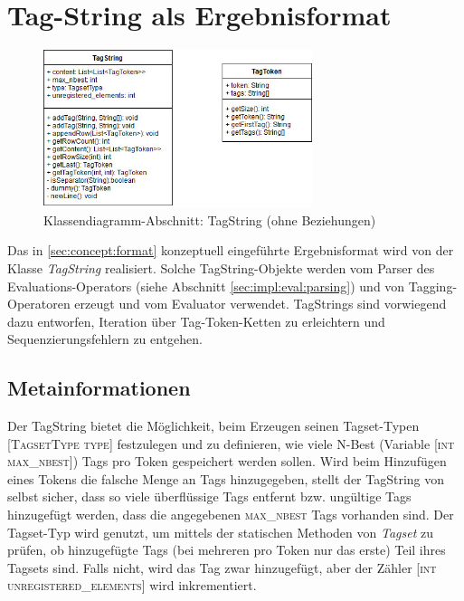 \section{Tag-String als Ergebnisformat}
\label{sec:impl:tagstring}

\begin{figure}[htb]
	\centering
	\captionsetup{justification=centering,margin=2cm}
	\includegraphics[width=0.7\textwidth]{gfx/tagstring_uml.jpg}
	
	\caption{Klassendiagramm-Abschnitt: TagString (ohne Beziehungen)} 
	\label{fig:impl:tagstring:uml}
\end{figure}

Das in \ref{sec:concept:format} konzeptuell eingeführte Ergebnisformat wird von der Klasse \textit{TagString} realisiert. Solche TagString-Objekte werden vom Parser des Evaluations-Operators (siehe Abschnitt \ref{sec:impl:eval:parsing}) und von Tagging-Operatoren erzeugt und vom Evaluator verwendet. TagStrings sind vorwiegend dazu entworfen, Iteration über Tag-Token-Ketten zu erleichtern und Sequenzierungsfehlern zu entgehen.

\subsection{Metainformationen}
Der TagString bietet die Möglichkeit, beim Erzeugen seinen Tagset-Typen \textsc{[TagsetType type]} festzulegen und zu definieren, wie viele N-Best (Variable \textsc{[int max\_nbest]}) Tags pro Token gespeichert werden sollen. Wird beim Hinzufügen eines Tokens die falsche Menge an Tags hinzugegeben, stellt der TagString von selbst sicher, dass so viele überflüssige Tags entfernt bzw. ungültige Tags hinzugefügt werden, dass die angegebenen \textsc{max\_nbest} Tags vorhanden sind. Der Tagset-Typ wird genutzt, um mittels der statischen Methoden von \textit{Tagset} zu prüfen, ob hinzugefügte Tags (bei mehreren pro Token nur das erste) Teil ihres Tagsets sind. Falls nicht, wird das Tag zwar hinzugefügt, aber der Zähler \textsc{[int unregistered\_elements]} wird inkrementiert.

